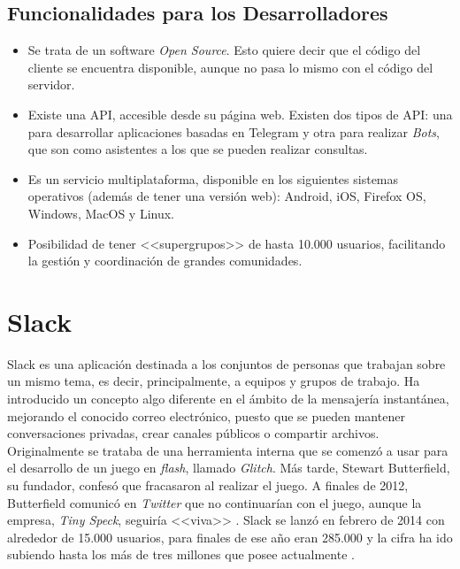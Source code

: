 \subsection{Funcionalidades para los Desarrolladores}

\begin{itemize}
	\item Se trata de un software \textit{Open Source}. Esto quiere decir que el código del cliente se encuentra disponible, aunque no pasa lo mismo con el código del servidor.
	\item Existe una \acs{API}, accesible desde su página web. Existen dos tipos de \acs{API}: una para desarrollar aplicaciones basadas en Telegram y otra para realizar \textit{Bots}, que son como asistentes a los que se pueden realizar consultas.
	\item Es un servicio multiplataforma, disponible en los siguientes sistemas operativos (además de tener una versión web): Android, iOS, Firefox OS, Windows, MacOS y Linux.
	\item Posibilidad de tener <<supergrupos>> de hasta 10.000 usuarios, facilitando la gestión y coordinación de grandes comunidades.
\end{itemize}



\section{Slack}
\label{sec:slack}

Slack es una aplicación destinada a los conjuntos de personas que trabajan sobre un mismo tema, es decir, principalmente, a equipos y grupos de trabajo. Ha introducido un concepto algo diferente en el ámbito de la mensajería instantánea, mejorando el conocido correo electrónico, puesto que se pueden mantener conversaciones privadas, crear canales públicos o compartir archivos. Originalmente se trataba de una herramienta interna que se comenzó a usar para el desarrollo de un juego en \textit{flash}, llamado \textit{Glitch}. Más tarde, Stewart Butterfield, su fundador, confesó que fracasaron al realizar el juego. A finales de 2012, Butterfield comunicó en \textit{Twitter} que no continuarían con el juego, aunque la empresa, \textit{Tiny Speck}, seguiría <<viva>> \cite{Thomas2015}. Slack se lanzó en febrero de 2014 con alrededor de 15.000 usuarios, para finales de ese año eran 285.000 y la cifra ha ido subiendo hasta los más de tres millones que posee actualmente \cite{PyMEs2017}.

